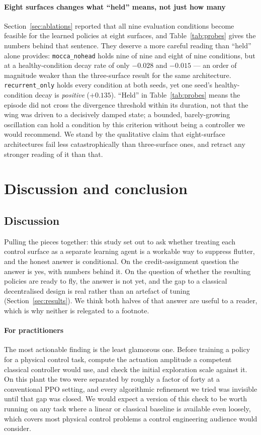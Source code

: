 \documentclass[preprint,11pt,authoryear]{elsarticle}
\begin{document}
\paragraph{Eight surfaces changes what ``held'' means, not just how many}
Section~\ref{sec:ablations} reported that all nine evaluation conditions become
feasible for the learned policies at eight surfaces, and Table~\ref{tab:probes}
gives the numbers behind that sentence. They deserve a more careful reading
than ``held'' alone provides: \texttt{mocca\_nohead} holds nine of nine and
eight of nine conditions, but at a healthy-condition decay rate of only
$-0.028$ and $-0.015$ --- an order of magnitude weaker than the three-surface
result for the same architecture. \texttt{recurrent\_only} holds every
condition at both seeds, yet one seed's healthy-condition decay is
\emph{positive} ($+0.135$). ``Held'' in Table~\ref{tab:probes} means the
episode did not cross the divergence threshold within its duration, not that
the wing was driven to a decisively damped state; a bounded, barely-growing
oscillation can hold a condition by this criterion without being a controller
we would recommend. We stand by the qualitative claim that eight-surface
architectures fail less catastrophically than three-surface ones, and retract
any stronger reading of it than that.

\section{Discussion and conclusion}
\label{sec:discussion}

\subsection{Discussion}

Pulling the pieces together: this study set out to ask whether treating each
control surface as a separate learning agent is a workable way to suppress
flutter, and the honest answer is conditional. On the credit-assignment
question the answer is yes, with numbers behind it. On the question of whether
the resulting policies are ready to fly, the answer is not yet, and the gap to a
classical decentralised design is real rather than an artefact of tuning
(Section~\ref{sec:results}). We think both halves of that answer are useful to a
reader, which is why neither is relegated to a footnote.

\paragraph{For practitioners}
The most actionable finding is the least glamorous one. Before training a policy
for a physical control task, compute the actuation amplitude a competent
classical controller would use, and check the initial exploration scale against
it. On this plant the two were separated by roughly a factor of forty at a
conventional PPO setting, and every algorithmic refinement we tried was
invisible until that gap was closed. We would expect a version of this check to
be worth running on any task where a linear or classical baseline is available
even loosely, which covers most physical control problems a control engineering
audience would consider.
\end{document}
